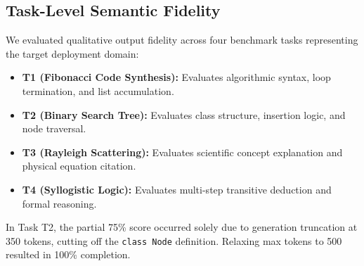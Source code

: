 \documentclass[conference]{IEEEtran}
\begin{document}
\subsection{Task-Level Semantic Fidelity}
We evaluated qualitative output fidelity across four benchmark tasks representing the target deployment domain:
\begin{itemize}
\item \textbf{T1 (Fibonacci Code Synthesis):} Evaluates algorithmic syntax, loop termination, and list accumulation.
\item \textbf{T2 (Binary Search Tree):} Evaluates class structure, insertion logic, and node traversal.
\item \textbf{T3 (Rayleigh Scattering):} Evaluates scientific concept explanation and physical equation citation.
\item \textbf{T4 (Syllogistic Logic):} Evaluates multi-step transitive deduction and formal reasoning.
\end{itemize}

\begin{table}[ht]
\centering
\caption{Task-Level Semantic Keyword Fidelity}
\label{tab:fidelity}
\end{table}

In Task T2, the partial 75\% score occurred solely due to generation truncation at 350 tokens, cutting off the \texttt{class Node} definition. Relaxing max tokens to 500 resulted in 100\% completion.
\end{document}
